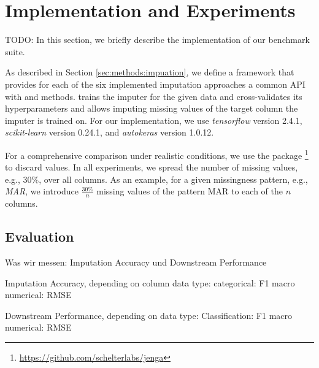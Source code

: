 
\section{Implementation and Experiments}
%
TODO: In this section, we briefly describe the implementation of our benchmark suite.

As described in Section \ref{sec:methods:impuation}, we define a framework that provides for each of the six implemented imputation approaches a common API with  and  methods.  trains the imputer for the given data and cross-validates its hyperparameters and  allows imputing missing values of the target column the imputer is trained on. For our implementation, we use \emph{tensorflow} version 2.4.1, \emph{scikit-learn} version 0.24.1, and \emph{autokeras} version 1.0.12.

For a comprehensive comparison under realistic conditions, we use the package \footnote{\url{https://github.com/schelterlabs/jenga}} \citep{Jenga} to discard values. In all experiments, we spread the number of missing values, e.g., $30\%$, over all columns. As an example, for a given missingness pattern, e.g., \emph{MAR}, we introduce $\frac{30\%}{n}$ missing values of the pattern MAR to each of the $n$ columns.


\subsection{Evaluation}
%


Was wir messen:
Imputation Accuracy und Downstream Performance

Imputation Accuracy, depending on column data type:
categorical: F1 macro
numerical: RMSE

Downstream Performance, depending on data type:
Classification: F1 macro
numerical: RMSE


